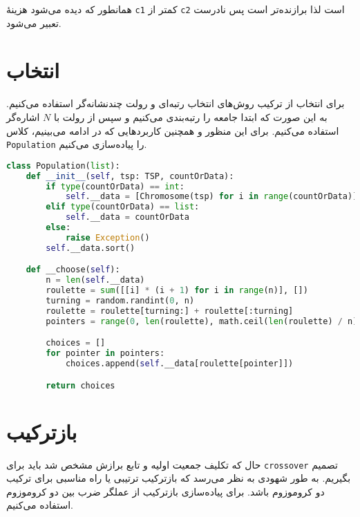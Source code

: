 \documentclass[a4paper, 12pt]{article}
\theoremstyle{definition}
\begin{document}
همانطور که دیده می‌شود هزینهٔ
\texttt{c1}
کمتر از
\texttt{c2}
است لذا برازنده‌تر است پس
نادرست تعبیر می‌شود.

\section{انتخاب}
برای انتخاب از ترکیب روش‌های انتخاب رتبه‌ای و رولت چندنشانه‌گر استفاده می‌کنیم. به این صورت که ابتدا جامعه را رتبه‌بندی می‌کنیم و سپس از رولت با
$N$
اشاره‌گر استفاده می‌کنیم. برای این منظور و همچنین کاربردهایی که در ادامه می‌بینیم، کلاس
\texttt{Population}
را پیاده‌سازی می‌کنیم.

\LTR
\begin{lstlisting}[language=Python]
class Population(list):
    def __init__(self, tsp: TSP, countOrData):
        if type(countOrData) == int:
            self.__data = [Chromosome(tsp) for i in range(countOrData)]
        elif type(countOrData) == list:
            self.__data = countOrData
        else:
            raise Exception()
        self.__data.sort()

    def __choose(self):
        n = len(self.__data)
        roulette = sum([[i] * (i + 1) for i in range(n)], [])
        turning = random.randint(0, n)
        roulette = roulette[turning:] + roulette[:turning]
        pointers = range(0, len(roulette), math.ceil(len(roulette) / n))

        choices = []
        for pointer in pointers:
            choices.append(self.__data[roulette[pointer]])

        return choices
\end{lstlisting}
\RTL


\section{بازترکیب}
حال که تکلیف جمعیت اولیه و تابع برازش مشخص شد باید برای
\texttt{crossover}
تصمیم بگیریم. به طور شهودی به نظر می‌رسد که بازترکیب ترتیبی یا
راه مناسبی برای ترکیب دو کروموزوم باشد. برای پیاده‌سازی بازترکیب از عملگر ضرب بین دو کروموزوم استفاده می‌کنیم.
\end{document}
